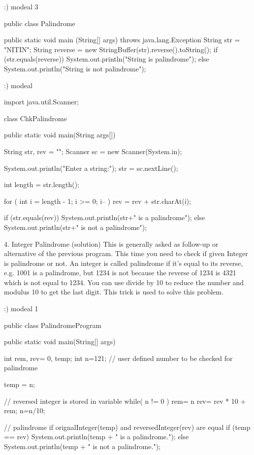 		
		:) modeal 3
		
		public class Palindrome {
		public static void main (String[] args) throws java.lang.Exception {
      String str = "NITIN";
      String reverse = new StringBuffer(str).reverse().toString();
      if (str.equals(reverse))
      System.out.println("String is palindrome");
      else
      System.out.println("String is not palindrome");
       }

    }
	
		:) modeal
		
		import java.util.Scanner;
 
	class ChkPalindrome
	{
   public static void main(String args[])
   {
      String str, rev = "";
      Scanner sc = new Scanner(System.in);
 
      System.out.println("Enter a string:");
      str = sc.nextLine();
 
      int length = str.length();
 
      for ( int i = length - 1; i >= 0; i-- )
         rev = rev + str.charAt(i);
 
      if (str.equals(rev))
         System.out.println(str+" is a palindrome");
      else
         System.out.println(str+" is not a palindrome");
 
		}
	}


 
 
 4. Integer Palindrome (solution)
This is generally asked as follow-up or alternative of the previous program.
 This time you need to check if given Integer is palindrome or not. An integer is called
 palindrome if it's equal to its reverse, e.g. 1001 is a palindrome, but 1234 is not because the
 reverse of 1234 is 4321 which is not equal to 1234. You can use divide by 10 to reduce the number
 and modulus 10 to get the last digit. This trick is used to solve this problem.
 
 :) modeal 1 

 public class PalindromeProgram {
 
    public static void main(String[] args) {
 
        int rem, rev= 0, temp;
    int n=121; // user defined number to be checked for palindrome 
 
        temp = n;
 
        // reversed integer is stored in variable 
        while( n != 0 )
        {
            rem= n %
            rev= rev * 10 + rem;
            n=n/10;
        }
 
        // palindrome if orignalInteger(temp) and reversedInteger(rev) are equal
        if (temp == rev)
            System.out.println(temp + " is a palindrome.");
        else
            System.out.println(temp + " is not a palindrome.");
    }
}

